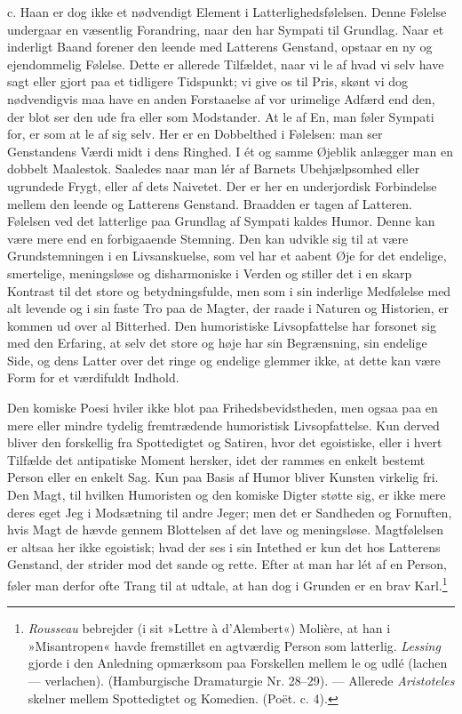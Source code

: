 \documentclass[12pt,a4paper,openany]{book}
\newcommand{\opage}[1]{\marginnote{\footnotesize\textit{[#1]}}}
\begin{document}
c. Haan er dog ikke et nødvendigt Element i Latterlighedsfølelsen. Denne
Følelse undergaar en væsentlig Forandring, naar den har Sympati til
Grundlag. Naar et inderligt Baand forener den leende med Latterens
Genstand, opstaar en ny og ejendommelig Følelse. Dette er allerede
Tilfældet, naar vi le af hvad vi selv have sagt eller gjort paa et
tidligere Tidspunkt; vi give os til Pris, skønt vi dog nødvendigvis maa
have en anden Forstaaelse af vor urimelige Adfærd end den, der blot ser
den ude fra eller som Modstander. At le af En, man føler Sympati for, er
som at le af sig selv. Her er en Dobbelthed i Følelsen: man ser
Genstandens Værdi midt i dens Ringhed. I ét og samme Øjeblik anlægger
man en dobbelt Maalestok. Saaledes naar man lér af Barnets
Ubehjælpsomhed eller ugrundede Frygt, eller af dets Naivetet. Der er her
en underjordisk Forbindelse mellem den leende og Latterens Genstand.
Braadden er tagen af Latteren. Følelsen ved det latterlige paa Grundlag
af Sympati kaldes Humor. Denne kan være mere end en forbigaaende
Stemning. Den kan udvikle sig til at være Grundstemningen i en
Livsanskuelse, som vel har et aabent Øje for det endelige, smertelige,
meningsløse og disharmoniske i Verden og stiller det i en skarp Kontrast
til det store og betydningsfulde, men som i sin inderlige Medfølelse med
alt levende og i sin faste Tro paa de Magter, der raade i Naturen og
Historien, er kommen ud over al Bitterhed. Den humoristiske
Livsopfattelse har forsonet sig med den Erfaring, at selv det store og
høje har sin Begrænsning, sin endelige Side, og dens Latter over det
ringe og endelige glemmer ikke, at dette kan være Form for et værdifuldt
Indhold.

Den komiske Poesi hviler ikke blot paa Frihedsbevidstheden, men ogsaa
paa en mere eller mindre tydelig fremtrædende humoristisk
Livsopfattelse. Kun derved bliver den forskellig fra Spottedigtet og
Satiren, hvor det egoistiske, eller i hvert Tilfælde det antipatiske
Moment hersker, idet der
\opage{349}rammes en enkelt bestemt Person eller en enkelt Sag. Kun paa
Basis af Humor bliver Kunsten virkelig fri. Den Magt, til hvilken
Humoristen og den komiske Digter støtte sig, er ikke mere deres eget Jeg
i Modsætning til andre Jeger; men det er Sandheden og Fornuften, hvis
Magt de hævde gennem Blottelsen af det lave og meningsløse. Magtfølelsen
er altsaa her ikke egoistisk; hvad der ses i sin Intethed er kun det hos
Latterens Genstand, der strider mod det sande og rette. Efter at man har
lét af en Person, føler man derfor ofte Trang til at udtale, at han dog
i Grunden er en brav Karl.\footnote[1]{\emph{Rousseau} bebrejder (i sit
»Lettre à d’Alembert«) Molière, at han i »Misantropen« havde fremstillet
en agtværdig Person som latterlig. \emph{Lessing} gjorde i den Anledning
opmærksom paa Forskellen mellem le og udlé (lachen --- verlachen).
(Hamburgische Dramaturgie Nr. 28--29). --- Allerede \emph{Aristoteles}
skelner mellem Spottedigtet og Komedien. (Poët. c. 4).}
\end{document}
